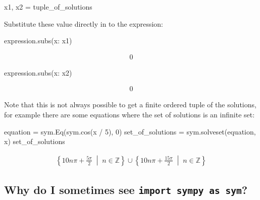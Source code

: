 \begin{pyin}
\begin{pyin}
x1, x2 = tuple_of_solutions
\end{pyin}

Substitute these value directly in to the expression:

\begin{pyin}
expression.subs({x: x1})
\end{pyin}




\begin{equation*}
\begin{split}\displaystyle 0\end{split}
\end{equation*}






\begin{pyin}
expression.subs({x: x2})
\end{pyin}




\begin{equation*}
\begin{split}\displaystyle 0\end{split}
\end{equation*}




Note that this is not always possible to get a finite ordered tuple of the
solutions, for example there are some equations
where the set of solutions is an infinite set:




\begin{pyin}
equation = sym.Eq(sym.cos(x / 5), 0)
set_of_solutions = sym.solveset(equation, x)
set_of_solutions
\end{pyin}




\begin{equation*}
\begin{split}\displaystyle \left\{10 n \pi + \frac{5 \pi}{2}\; \middle|\; n \in \mathbb{Z}\right\} \cup \left\{10 n \pi + \frac{15 \pi}{2}\; \middle|\; n \in \mathbb{Z}\right\}\end{split}
\end{equation*}




\subsection{Why do I sometimes see \texttt{import sympy as sym}?}
\label{\detokenize{tools-for-mathematics/02-algebra/why/main:why-do-i-sometimes-see-import-sympy-as-sym}}


\end{pyin}
